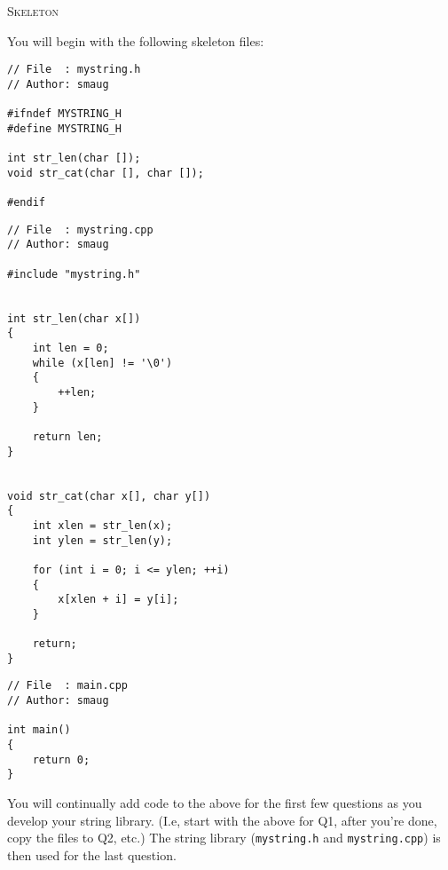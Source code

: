\textsc{Skeleton}

You will begin with the following skeleton files:
\begin{Verbatim}[frame=single,fontsize=\small]
// File  : mystring.h
// Author: smaug

#ifndef MYSTRING_H
#define MYSTRING_H

int str_len(char []);
void str_cat(char [], char []);

#endif

\end{Verbatim}

\begin{Verbatim}[frame=single,fontsize=\small]
// File  : mystring.cpp
// Author: smaug

#include "mystring.h"


int str_len(char x[])
{
    int len = 0;
    while (x[len] != '\0')
    {
        ++len;
    }

    return len;
}


void str_cat(char x[], char y[])
{
    int xlen = str_len(x);
    int ylen = str_len(y);

    for (int i = 0; i <= ylen; ++i)
    {
        x[xlen + i] = y[i];
    }

    return;
}
\end{Verbatim}

\begin{Verbatim}[frame=single,fontsize=\small]
// File  : main.cpp
// Author: smaug

int main()
{
    return 0;
}  
\end{Verbatim}

You will continually add code to the above for
the first few questions
as you develop your string library.
(I.e, start with the above for Q1, after you're done,
copy the files to Q2, etc.)
The string library (\verb!mystring.h! and \verb!mystring.cpp!)
is then used for the last question.
